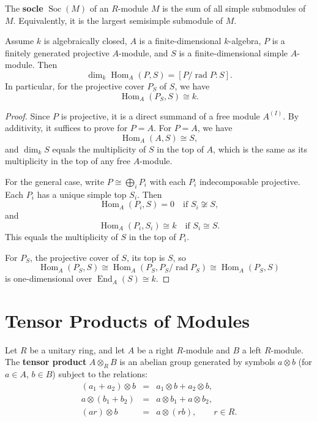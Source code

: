 \begin{defn}[Socle]
The \textbf{socle} $\operatorname{Soc}(M)$ of an $R$-module $M$ is the sum of all simple submodules of $M$. Equivalently, it is the largest semisimple submodule of $M$.
\end{defn}

\begin{prop}
Assume \(k\) is algebraically closed, \(A\) is a finite-dimensional \(k\)-algebra, \(P\) is a finitely generated projective \(A\)-module, and \(S\) is a finite-dimensional simple \(A\)-module. Then
\[
\dim_k \operatorname{Hom}_A(P,S)
=
[P/\operatorname{rad}P:S].
\]
In particular, for the projective cover \(P_S\) of \(S\), we have
\[
\operatorname{Hom}_A(P_S,S)\cong k.
\]
\end{prop}
\begin{proof}
Since \(P\) is projective, it is a direct summand of a free module \(A^{(I)}\). By additivity, it suffices to prove for \(P = A\). For \(P = A\), we have
\[
\operatorname{Hom}_A(A,S)\cong S,
\]
and \(\dim_k S\) equals the multiplicity of \(S\) in the top of \(A\), which is the same as its multiplicity in the top of any free \(A\)-module.

For the general case, write \(P\cong \bigoplus_i P_i\) with each \(P_i\) indecomposable projective. Each \(P_i\) has a unique simple top \(S_i\). Then
\[
\operatorname{Hom}_A(P_i,S)=0 \quad \text{if } S_i\not\cong S,
\]
and
\[
\operatorname{Hom}_A(P_i,S_i)\cong k \quad \text{if } S_i\cong S.
\]
This equals the multiplicity of \(S\) in the top of \(P_i\).

For \(P_S\), the projective cover of \(S\), its top is \(S\), so
\[
\operatorname{Hom}_A(P_S,S)
\cong
\operatorname{Hom}_A(P_S,P_S/\operatorname{rad}P_S)
\cong
\operatorname{Hom}_A(P_S,S)
\]
is one-dimensional over \(\operatorname{End}_A(S)\cong k\).
\end{proof}

\section{Tensor Products of Modules}

\begin{defn}
Let $R$  be a unitary ring, and let \(A\) be a right \(R\)-module and \(B\) a left \(R\)-module. The \textbf{tensor product} \(A \otimes_R B\) is an abelian group generated by symbols \(a \otimes b\) (for \(a \in A\), \(b \in B\)) subject to the relations:
\[
\begin{array}{rcl}
(a_1 + a_2) \otimes b &=& a_1 \otimes b + a_2 \otimes b,\\
a \otimes (b_1 + b_2) &=& a \otimes b_1 + a \otimes b_2,\\
(a r) \otimes b &=& a \otimes (r b), \qquad r \in R.
\end{array}
\]
\end{defn}

